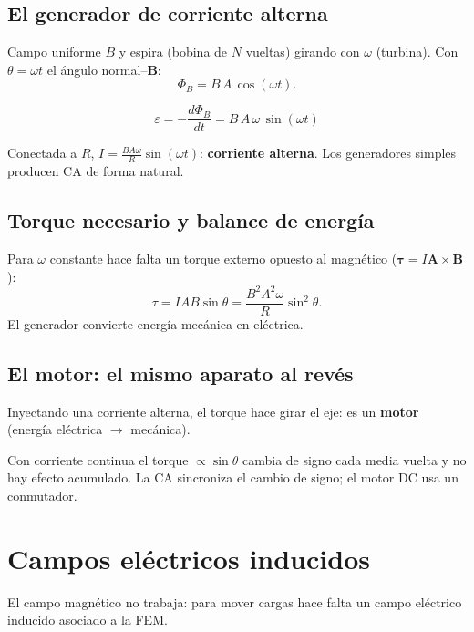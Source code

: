\documentclass[12pt,a4paper]{article}
\begin{document}
\subsection{El generador de corriente alterna}

Campo uniforme $B$ y espira (bobina de $N$ vueltas) girando con $\omega$
(turbina). Con $\theta = \omega t$ el ángulo normal--$\mathbf{B}$:
\[
\Phi_B = B\,A\,\cos(\omega t).
\]

\begin{keybox}
  \[
  \boxed{\varepsilon = -\frac{d\Phi_B}{dt} = B\,A\,\omega\,\sin(\omega t)}
  \]
\end{keybox}

Conectada a $R$, $I = \tfrac{BA\omega}{R}\sin(\omega t)$: \textbf{corriente
alterna}. Los generadores simples producen CA de forma natural.

\subsection{Torque necesario y balance de energía}

Para $\omega$ constante hace falta un torque externo opuesto al magnético
($\boldsymbol\tau = I\mathbf{A}\times\mathbf{B}$):
\[
\tau = I A B \sin\theta = \frac{B^2 A^2 \omega}{R}\sin^2\theta.
\]
El generador convierte energía mecánica en eléctrica.

\subsection{El motor: el mismo aparato al revés}

Inyectando una corriente alterna, el torque hace girar el eje: es un
\textbf{motor} (energía eléctrica $\to$ mecánica).

\begin{notebox}
  Con corriente continua el torque $\propto\sin\theta$ cambia de signo cada
  media vuelta y no hay efecto acumulado. La CA sincroniza el cambio de signo;
  el motor DC usa un conmutador.
\end{notebox}

\section{Campos eléctricos inducidos}

El campo magnético no trabaja: para mover cargas hace falta un campo eléctrico
inducido asociado a la FEM.
\end{document}
